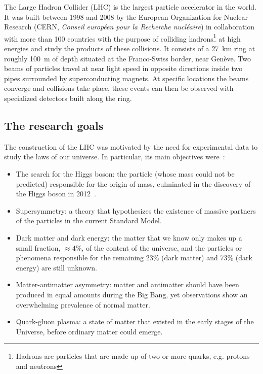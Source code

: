 The Large Hadron Collider (LHC) is the largest particle accelerator in the world. It was built between 1998 and 2008 by the European Organization for Nuclear Research (CERN, \textit{Conseil européen pour la Recherche nucléaire}) in collaboration with more than 100 countries with the purpose of colliding hadrons\footnote{\label{footnote:hadrons}Hadrons are particles that are made up of two or more quarks, e.g. protons and neutrons} at high energies and study the products of these collisions. It consists of a \qty{27}{\kilo\meter} ring at roughly \qty{100}{\meter} of depth situated at the Franco-Swiss border, near Genève. Two beams of particles travel at near light speed in opposite directions inside two pipes surrounded by superconducting magnets. At specific locations the beams converge and collisions take place, these events can then be observed with specialized detectors built along the ring.


\subsection{The research goals}%

The construction of the LHC was motivated by the need for experimental data to study the laws of our universe. In particular, its main objectives were~\cite{homeFactsFigures}:
\begin{itemize}
    \item The search for the Higgs boson: the particle (whose mass could not be predicted) responsible for the origin of mass, culminated in the discovery of the Higgs boson in 2012~\cite{ATLAS:2012yve}. 
    \item Supersymmetry: a theory that hypothesizes the existence of massive partners of the particles in the current Standard Model.
    \item Dark matter and dark energy: the matter that we know only makes up a small fraction, \(\approx\)4\%, of the content of the universe, and the particles or phenomena responsible for the remaining 23\% (dark matter) and 73\% (dark energy) are still unknown.
    \item Matter-antimatter asymmetry: matter and antimatter should have been produced in equal amounts during the Big Bang, yet observations show an overwhelming prevalence of normal matter.
    \item Quark-gluon plasma: a state of matter that existed in the early stages of the Universe, before ordinary matter could emerge.
\end{itemize}

